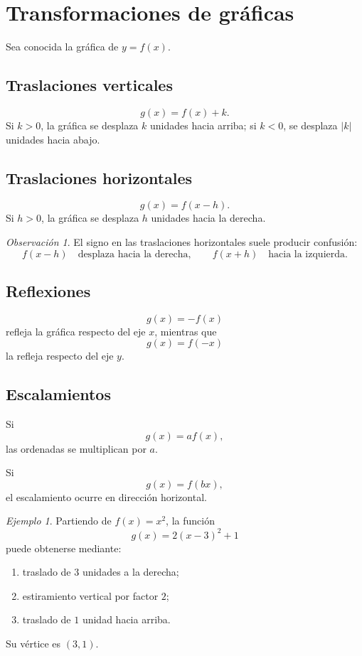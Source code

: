 \documentclass[12pt]{article}
\theoremstyle{remark}
\newtheorem{observacion}{Observación}[section]
\newtheorem{ejemplo}{Ejemplo}[section]
\begin{document}
\section*{Transformaciones de gráficas}

Sea conocida la gráfica de $y=f(x)$.

\subsection*{Traslaciones verticales}

\[
g(x)=f(x)+k.
\]
Si $k>0$, la gráfica se desplaza $k$ unidades hacia arriba; si $k<0$, se
desplaza $|k|$ unidades hacia abajo.

\subsection*{Traslaciones horizontales}

\[
g(x)=f(x-h).
\]
Si $h>0$, la gráfica se desplaza $h$ unidades hacia la derecha.

\begin{observacion}
El signo en las traslaciones horizontales suele producir confusión:
\[
f(x-h)\quad\text{desplaza hacia la derecha},
\qquad
f(x+h)\quad\text{hacia la izquierda}.
\]
\end{observacion}

\subsection*{Reflexiones}

\[
g(x)=-f(x)
\]
refleja la gráfica respecto del eje $x$, mientras que
\[
g(x)=f(-x)
\]
la refleja respecto del eje $y$.

\subsection*{Escalamientos}

Si
\[
g(x)=af(x),
\]
las ordenadas se multiplican por $a$.

Si
\[
g(x)=f(bx),
\]
el escalamiento ocurre en dirección horizontal.

\begin{ejemplo}
Partiendo de $f(x)=x^2$, la función
\[
g(x)=2(x-3)^2+1
\]
puede obtenerse mediante:
\begin{enumerate}
    \item traslado de $3$ unidades a la derecha;
    \item estiramiento vertical por factor $2$;
    \item traslado de $1$ unidad hacia arriba.
\end{enumerate}
Su vértice es $(3,1)$.
\end{ejemplo}
\end{document}
